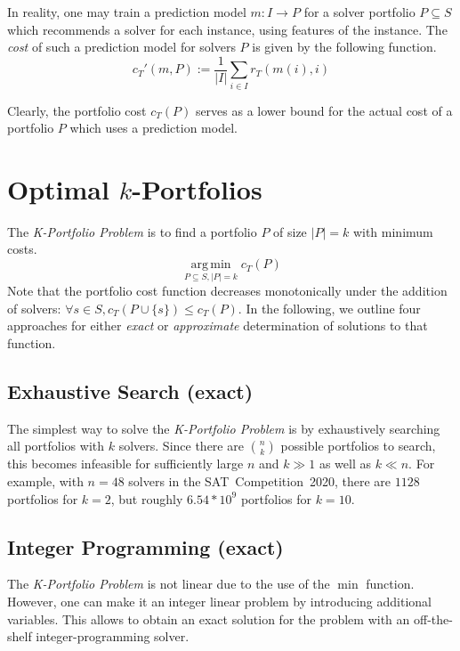 \documentclass[conference]{IEEEtran}
\DeclareMathOperator*{\argmin}{arg\,min}
\begin{document}
In reality, one may train a prediction model $m : I \rightarrow P$ for a solver portfolio $P \subseteq S$ which recommends a solver for each instance, using features of the instance. 
The \emph{cost} of such a prediction model for solvers $P$ is given by the following function.%
$$
	c_{T}'(m,P) := \frac{1}{|I|} \sum\limits_{i \in I}{r_T(m(i),i)}
$$

Clearly, the portfolio cost $c_{T}(P)$ serves as a lower bound for the actual cost of a portfolio $P$ which uses a prediction model.

\section{Optimal \texorpdfstring{$k$}{k}-Portfolios} %
\label{sec:approach}

The \emph{K-Portfolio Problem} is to find a portfolio $P$ of size $|P| = k$ with minimum costs.%
$$
\argmin\limits_{P \subseteq S, |P| = k} c_{T}(P)
$$
Note that the portfolio cost function decreases monotonically under the addition of solvers: $\forall s \in S, c_{T}(P \cup \{s\}) \leq c_{T}(P)$. 
In the following, we outline four approaches for either \emph{exact} or \emph{approximate} determination of solutions to that function. 

\subsection{Exhaustive Search (exact)}

The simplest way to solve the \emph{K-Portfolio Problem} is by exhaustively searching all portfolios with $k$ solvers. 
Since there are $\binom{n}{k}$ possible portfolios to search, this becomes infeasible for sufficiently large $n$ and $k \gg 1$ as well as $k \ll n$.
For example, with $n=48$ solvers in the SAT~Competition~2020, there are $1128$ portfolios for $k=2$, but roughly $6.54 * 10^9$ portfolios for $k=10$.

\subsection{Integer Programming (exact)}

The \emph{K-Portfolio Problem} is not linear due to the use of the $\min$ function.
However, one can make it an integer linear problem by introducing additional variables.
This allows to obtain an exact solution for the problem with an off-the-shelf integer-programming solver.
\end{document}
